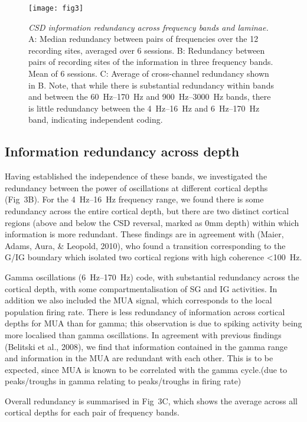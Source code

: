 \begin{figure}[htbp]
\centering \texttt{[image: fig3]}
%
\caption{%
\textit{\ac{CSD} information redundancy across frequency bands and laminae.}
A: Median redundancy between pairs of frequencies over the 12 recording 
sites, averaged over 6 sessions.
B: Redundancy between pairs of recording sites of the information in three 
frequency bands.
Mean of 6 sessions.
C: Average of cross-channel redundancy shown in B.
Note, that while there is substantial redundancy within bands and between the 
\SIrange{60}{170}{Hz} and \SIrange{900}{3000}{Hz} bands, there is little redundancy between the \SIrange{4}{16}{Hz} and
\SIrange{6}{170}{Hz} band, indicating independent coding.}%
\label{fig:lam_3}
%
\end{figure}

\subsection{Information redundancy across depth}
Having established the independence of these bands, we investigated the redundancy between the power of oscillations at different cortical depths (Fig~3B).
For the \SIrange{4}{16}{Hz} frequency range, we found there is some redundancy across the entire cortical depth, but there are two distinct cortical regions (above and below the \ac{CSD} reversal, marked as 0mm depth) within which information is more redundant.
These findings are in agreement with (Maier, Adams, Aura, \& Leopold, 2010), who found a transition corresponding to the \ac{G}/\ac{IG} boundary which isolated two cortical regions with high coherence \SI{<100}{Hz}.

Gamma oscillations (\SIrange{6}{170}{Hz}) code, with substantial redundancy across the cortical depth, with some compartmentalisation of \ac{SG} and \ac{IG} activities.
In addition we also included the \ac{MUA} signal, which corresponds to the local population firing rate.
There is less redundancy of information across cortical depths for \ac{MUA} than for gamma; this observation is due to spiking activity being more localised than gamma oscillations.
In agreement with previous findings (Belitski et al., 2008), we find that information contained in the gamma range and information in the \ac{MUA} are redundant with each other.
This is to be expected, since \ac{MUA} is known to be correlated with the gamma cycle.(due to peaks/troughs in gamma relating to peaks/troughs in firing rate)

Overall redundancy is summarised in Fig~3C, which shows the average across all cortical depths for each pair of frequency bands.

